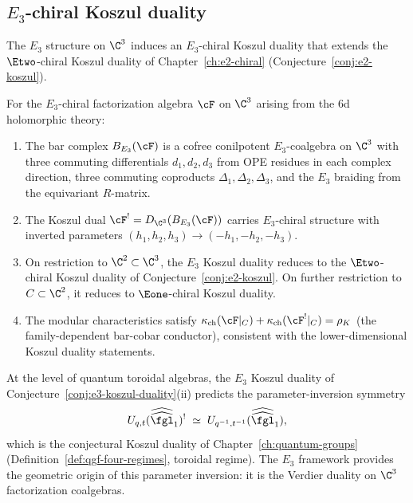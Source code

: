\subsection{\texorpdfstring{$E_3$}{E-3}-chiral Koszul duality}
\label{subsec:e3-koszul}

The $E_3$ structure on $\C^3$ induces an $E_3$-chiral Koszul duality that extends the $\Etwo$-chiral Koszul duality of Chapter~\ref{ch:e2-chiral} (Conjecture~\ref{conj:e2-koszul}).

\begin{conjecture}
\label{conj:e3-koszul-duality}
\ClaimStatusConjectured
For the $E_3$-chiral factorization algebra $\cF$ on $\C^3$ arising from the 6d holomorphic theory:
\begin{enumerate}[label=\textup{(\roman*)}]
 \item The bar complex $B_{E_3}(\cF)$ is a cofree conilpotent $E_3$-coalgebra on $\C^3$ with three commuting differentials $d_1, d_2, d_3$ from OPE residues in each complex direction, three commuting coproducts $\Delta_1, \Delta_2, \Delta_3$, and the $E_3$ braiding from the equivariant $R$-matrix.
 \item The Koszul dual $\cF^! = D_{\C^3}(B_{E_3}(\cF))$ carries $E_3$-chiral structure with inverted parameters $(h_1, h_2, h_3) \to (-h_1, -h_2, -h_3)$.
 \item On restriction to $\C^2 \subset \C^3$, the $E_3$ Koszul duality reduces to the $\Etwo$-chiral Koszul duality of Conjecture~\ref{conj:e2-koszul}. On further restriction to $C \subset \C^2$, it reduces to $\Eone$-chiral Koszul duality.
 \item The modular characteristics satisfy $\kappa_{\mathrm{ch}}(\cF|_C) + \kappa_{\mathrm{ch}}(\cF^!|_C) = \rho_K$ (the family-dependent bar-cobar conductor), consistent with the lower-dimensional Koszul duality statements.
\end{enumerate}
\end{conjecture}

\begin{remark}
\label{rem:e3-koszul-toroidal}
At the level of quantum toroidal algebras, the $E_3$ Koszul duality of Conjecture~\ref{conj:e3-koszul-duality}(ii) predicts the parameter-inversion symmetry
\[
 U_{q,t}(\widehat{\widehat{\fgl}}_1)^! \;\simeq\; U_{q^{-1}, t^{-1}}(\widehat{\widehat{\fgl}}_1),
\]
which is the conjectural Koszul duality of Chapter~\ref{ch:quantum-groups} (Definition~\ref{def:qgf-four-regimes}, toroidal regime). The $E_3$ framework provides the geometric origin of this parameter inversion: it is the Verdier duality on $\C^3$ factorization coalgebras.
\end{remark}

